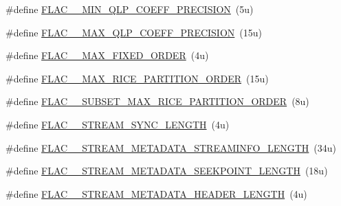\begin{DoxyCompactItemize}
\item 
\#define \hyperlink{group__flac__format_gaf52033b2950b9396dd92b167b3bbe4db}{F\+L\+A\+C\+\_\+\+\_\+\+M\+I\+N\+\_\+\+Q\+L\+P\+\_\+\+C\+O\+E\+F\+F\+\_\+\+P\+R\+E\+C\+I\+S\+I\+ON}~(5u)
\item 
\#define \hyperlink{group__flac__format_ga6aa38a4bc5b9d96a78253ccb8b08bd1f}{F\+L\+A\+C\+\_\+\+\_\+\+M\+A\+X\+\_\+\+Q\+L\+P\+\_\+\+C\+O\+E\+F\+F\+\_\+\+P\+R\+E\+C\+I\+S\+I\+ON}~(15u)
\item 
\#define \hyperlink{group__flac__format_gabd0d5d6fe71b337244712b244ae7cb0f}{F\+L\+A\+C\+\_\+\+\_\+\+M\+A\+X\+\_\+\+F\+I\+X\+E\+D\+\_\+\+O\+R\+D\+ER}~(4u)
\item 
\#define \hyperlink{group__flac__format_ga78a2e97e230b2aa7f99edc94a466f5bb}{F\+L\+A\+C\+\_\+\+\_\+\+M\+A\+X\+\_\+\+R\+I\+C\+E\+\_\+\+P\+A\+R\+T\+I\+T\+I\+O\+N\+\_\+\+O\+R\+D\+ER}~(15u)
\item 
\#define \hyperlink{group__flac__format_gab19dec1b56de482ccfeb5f9843f60a14}{F\+L\+A\+C\+\_\+\+\_\+\+S\+U\+B\+S\+E\+T\+\_\+\+M\+A\+X\+\_\+\+R\+I\+C\+E\+\_\+\+P\+A\+R\+T\+I\+T\+I\+O\+N\+\_\+\+O\+R\+D\+ER}~(8u)
\item 
\#define \hyperlink{group__flac__format_gae7ddaf298d3ceb83aae6301908675c1d}{F\+L\+A\+C\+\_\+\+\_\+\+S\+T\+R\+E\+A\+M\+\_\+\+S\+Y\+N\+C\+\_\+\+L\+E\+N\+G\+TH}~(4u)
\item 
\#define \hyperlink{group__flac__format_ga06dfae7260da40e4c5f8fc4d531b326c}{F\+L\+A\+C\+\_\+\+\_\+\+S\+T\+R\+E\+A\+M\+\_\+\+M\+E\+T\+A\+D\+A\+T\+A\+\_\+\+S\+T\+R\+E\+A\+M\+I\+N\+F\+O\+\_\+\+L\+E\+N\+G\+TH}~(34u)
\item 
\#define \hyperlink{group__flac__format_gabdf85aa2c9a483378dfe850b85ab93ef}{F\+L\+A\+C\+\_\+\+\_\+\+S\+T\+R\+E\+A\+M\+\_\+\+M\+E\+T\+A\+D\+A\+T\+A\+\_\+\+S\+E\+E\+K\+P\+O\+I\+N\+T\+\_\+\+L\+E\+N\+G\+TH}~(18u)
\item 
\#define \hyperlink{group__flac__format_ga706a29b8a14902c457783bfd4fd7bab2}{F\+L\+A\+C\+\_\+\+\_\+\+S\+T\+R\+E\+A\+M\+\_\+\+M\+E\+T\+A\+D\+A\+T\+A\+\_\+\+H\+E\+A\+D\+E\+R\+\_\+\+L\+E\+N\+G\+TH}~(4u)
\end{DoxyCompactItemize}
